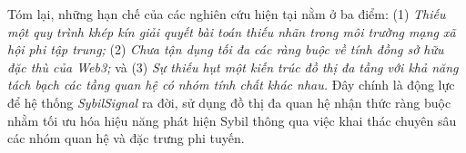 Tóm lại, những hạn chế của các nghiên cứu hiện tại nằm ở ba điểm: (1) \textit{Thiếu một quy trình khép kín giải quyết bài toán thiếu nhãn trong môi trường mạng xã hội phi tập trung;} (2) \textit{Chưa tận dụng tối đa các ràng buộc về tính đồng sở hữu đặc thù của Web3;} và (3) \textit{Sự thiếu hụt một kiến trúc đồ thị đa tầng với khả năng tách bạch các tầng quan hệ có nhóm tính chất khác nhau.} Đây chính là động lực để hệ thống \textit{SybilSignal} ra đời, sử dụng đồ thị đa quan hệ nhận thức ràng buộc nhằm tối ưu hóa hiệu năng phát hiện Sybil thông qua việc khai thác chuyên sâu các nhóm quan hệ và đặc trưng phi tuyến.